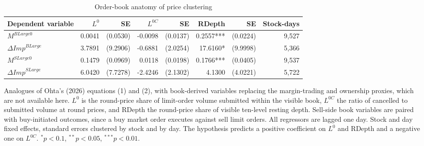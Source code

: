 \begin{table}[htbp]
\centering
\caption{Order-book anatomy of price clustering}
\label{tab:rq3}
\small
\begin{threeparttable}
\begin{tabular}{@{}lrrrrrrr@{}}
\toprule
Dependent variable & $L^{0}$ & SE & $L^{0C}$ & SE & RDepth & SE & Stock-days \\
\midrule
$M^{BLarge0}$ & 0.0041 & (0.0530) & -0.0098 & (0.0137) & 0.2557*** & (0.0224) & 9,527 \\
$\Delta\mathit{Imp}^{BLarge}$ & 3.7891 & (9.2906) & -0.6881 & (2.0254) & 17.6160* & (9.9998) & 5,366 \\
$M^{SLarge0}$ & 0.1479 & (0.0969) & 0.0118 & (0.0198) & 0.1766*** & (0.0405) & 9,537 \\
$\Delta\mathit{Imp}^{SLarge}$ & 6.0420 & (7.7278) & -2.4246 & (2.1302) & 4.1300 & (4.0221) & 5,722 \\
\bottomrule
\end{tabular}
\begin{tablenotes}[flushleft]\footnotesize
\item Analogues of Ohta's (2026) equations (1) and (2), with book-derived variables replacing the margin-trading and ownership proxies, which are not available here. $L^{0}$ is the round-price share of limit-order volume submitted within the visible book, $L^{0C}$ the ratio of cancelled to submitted volume at round prices, and RDepth the round-price share of visible ten-level resting depth. Sell-side book variables are paired with buy-initiated outcomes, since a buy market order executes against sell limit orders. All regressors are lagged one day. Stock and day fixed effects, standard errors clustered by stock and by day. The hypothesis predicts a positive coefficient on $L^{0}$ and RDepth and a negative one on $L^{0C}$. $^{*}p<0.1$, $^{**}p<0.05$, $^{***}p<0.01$.
\end{tablenotes}
\end{threeparttable}
\end{table}
